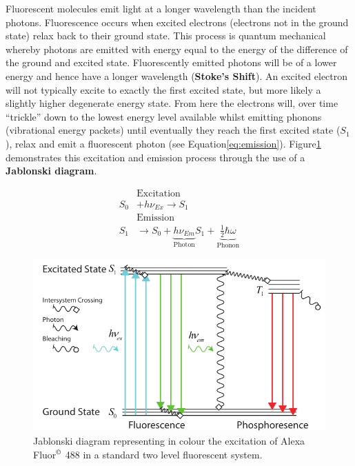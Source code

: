Fluorescent molecules emit light at a longer wavelength than the incident photons.
Fluorescence occurs when excited electrons (electrons not in the ground state) relax back to their ground state.
This process is quantum mechanical whereby photons are emitted with energy equal to the energy of the difference of the ground and excited state\cite{Lakowicz2007}.
Fluorescently emitted photons will be of a lower energy and hence have a longer wavelength (\textbf{Stoke's Shift}).
An excited electron will not typically excite to exactly the first excited state, but more likely a slightly higher degenerate energy state.
From here the electrons will, over time ``trickle'' down to the lowest energy level available whilst emitting phonons (vibrational energy packets) until eventually they reach the first excited state (\(S_1\)), relax and emit a fluorescent photon (see Equation\eqref{eq:emission}).
Figure\ref{fig:jablonski} demonstrates this excitation and emission process through the use of a \textbf{Jablonski diagram}.

\begin{align}
&\text{Excitation}\nonumber \\
S_0 &+ h \nu_{Ex} \rightarrow S_1 \label{eq:excitation}\\
&\text{Emission}\nonumber \\
S_1 &\rightarrow S_0 + \underbrace{h \nu_{Em}}_{\text{Photon}}  S_1 + \underbrace{\frac{1}{2} \hbar \omega}_{\text{Phonon}} \label{eq:emission}
\end{align}

\begin{figure}
\centering
\includegraphics[width=0.7\linewidth]{jablonski_triplet}
\caption[Standard jablonski diagram]{Jablonski diagram representing in colour the excitation of Alexa Fluor\(^{\copyright}\) 488 in a standard two level fluorescent system.}\label{fig:jablonski}
\end{figure}


